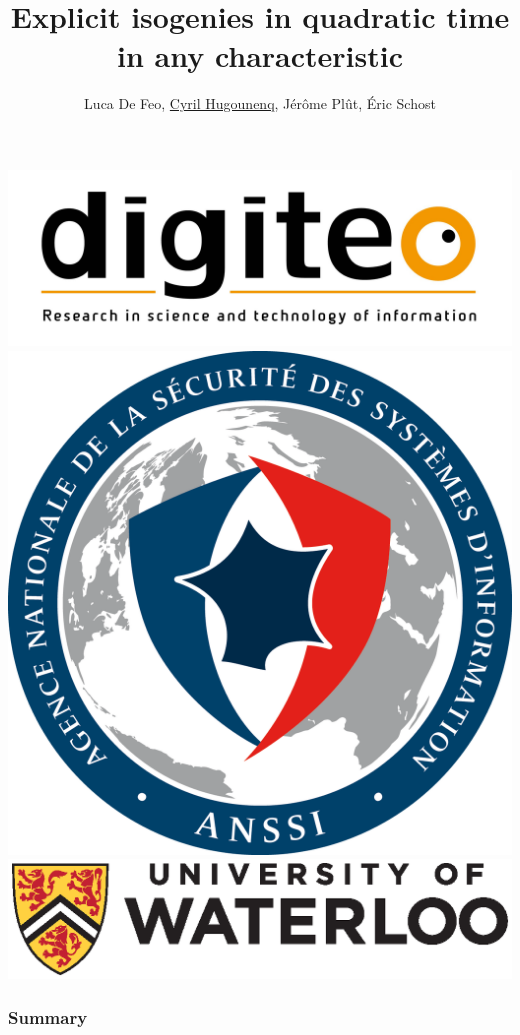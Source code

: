 \documentclass[10pt,a4paper]{beamer}
\theoremstyle{plain}
\theoremstyle{definition}
\theoremstyle{definition}
\theoremstyle{definition}
\theoremstyle{definition}
\theoremstyle{remark}
\theoremstyle{remark}
\begin{document}
\author{
 Luca De Feo, \underline{Cyril Hugounenq}, J\'er\^ome Pl\^ut, \'Eric Schost
}
\title[Explicit isogenies in quadratic time in any characteristic]{
Explicit isogenies in quadratic time in any characteristic}
\begin{frame}
\titlepage
\includegraphics[scale=0.1]{Images/digiteo.jpg} 
\includegraphics[scale=0.03]{Images/Anssi.png} 
\includegraphics[scale=0.18]{Images/UniversityOfWaterloo_logo_horiz_pms.eps}
\end{frame}
\begin{frame}
\frametitle{Summary}
\tableofcontents
\end{frame}
\end{document}
